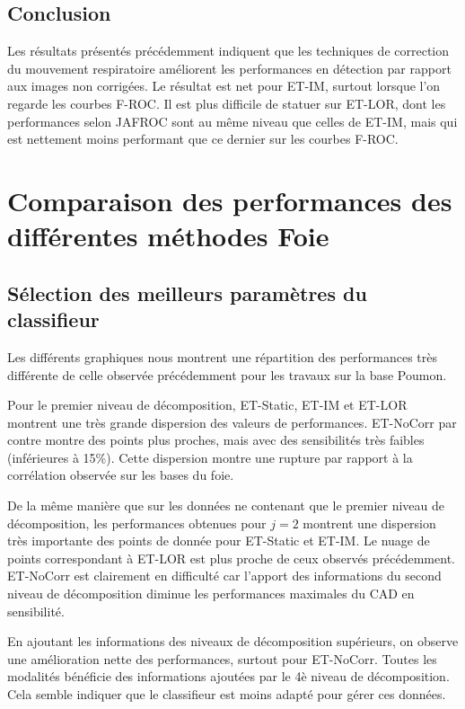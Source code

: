 \subsection{Conclusion}

Les résultats présentés précédemment indiquent que les techniques de correction du mouvement respiratoire améliorent les performances en détection par rapport aux images non corrigées. Le résultat est net pour ET-IM, surtout lorsque l'on regarde les courbes F-ROC. Il est plus difficile de statuer sur ET-LOR, dont les performances selon JAFROC sont au même niveau que celles de ET-IM, mais qui est nettement moins performant que ce dernier sur les courbes F-ROC.


\FloatBarrier

\section{Comparaison des performances des différentes méthodes Foie}


\subsection{Sélection des meilleurs paramètres du classifieur}



Les différents graphiques nous montrent une répartition des performances très différente de celle observée précédemment pour les travaux sur la base Poumon. 

Pour le premier niveau de décomposition, ET-Static, ET-IM et ET-LOR montrent une très grande dispersion des valeurs de performances. ET-NoCorr par contre montre des points plus proches, mais avec des sensibilités très faibles (inférieures à 15\%). Cette dispersion montre une rupture par rapport à la corrélation observée sur les bases du foie.

De la même manière que sur les données ne contenant que le premier niveau de décomposition, les performances obtenues pour $j=2$ montrent une dispersion très importante des points de donnée pour ET-Static et ET-IM. Le nuage de points correspondant à ET-LOR est plus proche de ceux observés précédemment. ET-NoCorr est clairement en difficulté car l'apport des informations du second niveau de décomposition diminue les performances maximales du CAD en sensibilité.

En ajoutant les informations des niveaux de décomposition supérieurs, on observe une amélioration nette des performances, surtout pour ET-NoCorr. Toutes les modalités bénéficie des informations ajoutées par le 4è niveau de décomposition. Cela semble indiquer que le classifieur est moins adapté pour gérer ces données. 

